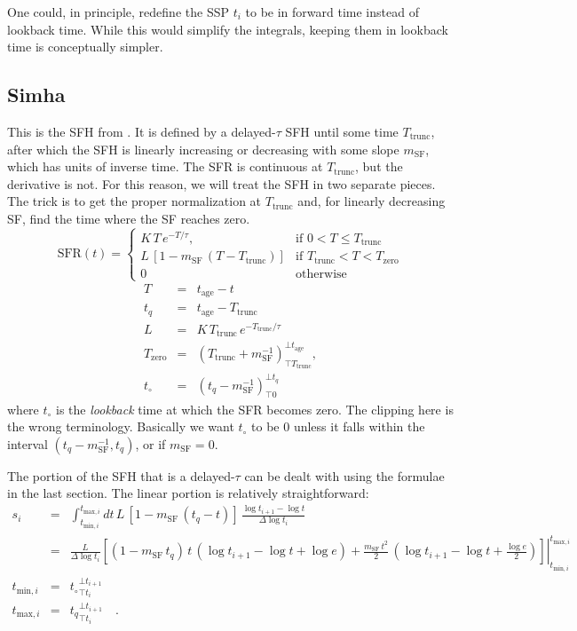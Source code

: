 \documentclass[12pt, letterpaper, preprint]{aastex}
\newcommand{\tmin}[1][]{t_{\mathrm{min} #1}}
\newcommand{\tmax}[1][]{t_{\mathrm{max} #1}}
\newcommand{\dlt}{\Delta\log t_i}
\newcommand{\tintegral}{\int_{\tmin[,i]}^{\tmax[,i]} dt}
\newcommand{\tinterval}{\right|_{\tmin[,i]}^{\tmax[,i]}}
\newcommand{\clip}[3][]{{#1}_{\top {#2}}^{\bot {#3}}}
\newcommand{\sftrunc}{T_{\mathrm{trunc}}}
\newcommand{\tage}{t_{\mathrm{age}}}
\newcommand{\sfzero}{T_{\mathrm{zero}}}
\newcommand{\tzero}{t_{\circ}}
\newcommand{\sfslope}{m_{\mathrm{SF}}}
\begin{document}
One could, in principle, redefine the SSP $t_i$ to be in forward time instead of lookback time.  While this would simplify the integrals, keeping them in lookback time is conceptually simpler.

\subsection{Simha}
This is the SFH from \citet{simha14}.  
It is defined by a delayed-$\tau$ SFH until some time $\sftrunc$, after which the SFH is linearly increasing or decreasing with some slope $m_{\mathrm{SF}}$, which has units of inverse time.
The SFR is continuous at $\sftrunc$, but the derivative is not.  
For this reason, we will treat the SFH in two separate pieces.  
The trick is to get the proper normalization at $\sftrunc$ and, for linearly decreasing SF, find the time where the SF reaches zero. 
\[ 
\mathrm{SFR}(t) = 
\begin{cases}
K \, T \, e^{-T/\tau}, &  \text{if } 0 < T \leq \sftrunc \\
L\, \left[1 - \sfslope \, (T - \sftrunc)\right] & \text{if } \sftrunc < T  < \sfzero \\
0 & \text{otherwise}
\end{cases}
\]
\begin{eqnarray}
T & = & \tage - t \nonumber \\
t_q & = & \tage - \sftrunc \nonumber \\
L & = & K \, \sftrunc \, e^{-\sftrunc/\tau} \nonumber \\
\sfzero & = & \clip[\left(\sftrunc + \sfslope^{-1}\right)]{\sftrunc}{\tage}, \nonumber \\
\tzero & = & \clip[\left( t_q - \sfslope^{-1}\right)]{0}{t_q} \nonumber
\end{eqnarray}
where $\tzero$ is the \emph{lookback} time at which the SFR becomes zero.  The clipping here is the wrong terminology.  Basically we want $\tzero$ to be 0 unless it falls within the interval $(t_q -\sfslope^{-1}, t_q)$, or if $\sfslope=0$.

The portion of the SFH that is a delayed-$\tau$ can be dealt with using the formulae in the last section.  The linear portion is relatively straightforward:
\begin{eqnarray}
s_i  & = & \tintegral \,  L\, \left[1 - \sfslope \, (t_q - t)\right] \, \frac{\log t_{i+1} - \log t}{\dlt}  \nonumber \\
      & = & \frac{L}{\dlt} \left.\left[(1-\sfslope\, t_q) \, t \, \left(\log t_{i+1} - \log t +\log e \right) + 
                                                     \frac{\sfslope \, t^2}{2} \, \left(\log t_{i+1} - \log t +\frac{\log e}{2}\right) \right] \tinterval \\
\tmin[,i] & = & \clip[\tzero]{t_i}{t_{i+1}} \nonumber \\
\tmax[,i] & = & \clip[t_q]{t_i}{t_{i+1}} \quad . \nonumber
\end{eqnarray}
\end{document}
